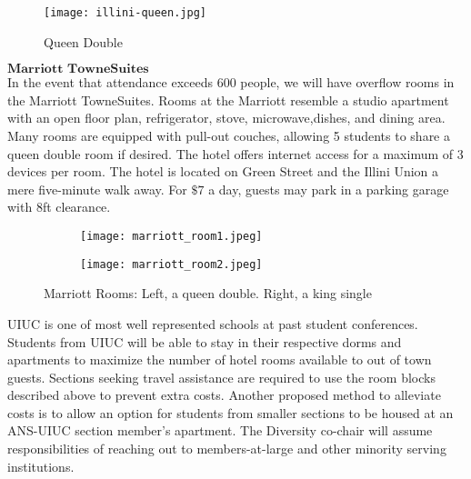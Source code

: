 \begin{figure}[H]
	\centering
	\texttt{[image: illini-queen.jpg]}
	\caption{Queen Double}		
\end{figure} 

$\textbf{Marriott TowneSuites}$\\
In the event that attendance exceeds 600 people, we will have overflow rooms in the Marriott TowneSuites. Rooms at the Marriott resemble a studio apartment with an open floor plan, refrigerator, stove, microwave,dishes, and dining area. Many rooms are equipped with pull-out couches, allowing 5 students to share a queen double room if desired. The hotel offers internet access for a maximum of 3 devices per room. The hotel is located on Green Street and the Illini Union a mere five-minute walk away. For $\$7$ a day, guests may park in a parking garage with 8ft clearance.\\
\begin{figure}[H]
	\centering
	\begin{subfigure}{0.5\textwidth}
		\centering
		\texttt{[image: marriott\_room1.jpeg]}
	\end{subfigure}%
	\begin{subfigure}{0.5\textwidth}
		\centering
		\texttt{[image: marriott\_room2.jpeg]}
	\end{subfigure}
	\caption{Marriott Rooms: Left, a queen double. Right, a king single}		
\end{figure} 

UIUC is one of most well represented schools at past student conferences. Students from UIUC will be able to stay in their respective dorms and apartments to maximize the number of hotel rooms available to out of town guests. Sections seeking travel assistance are required to use the room blocks described above to prevent extra costs. Another proposed method to alleviate costs is to allow an option for students from smaller sections to be housed at an ANS-UIUC section member's apartment. The Diversity co-chair will assume responsibilities of reaching out to members-at-large and other minority serving institutions. 


\begin{table}
\caption{Cost of Hotels}
\label{table:hotels}
	\centering
\end{table}

